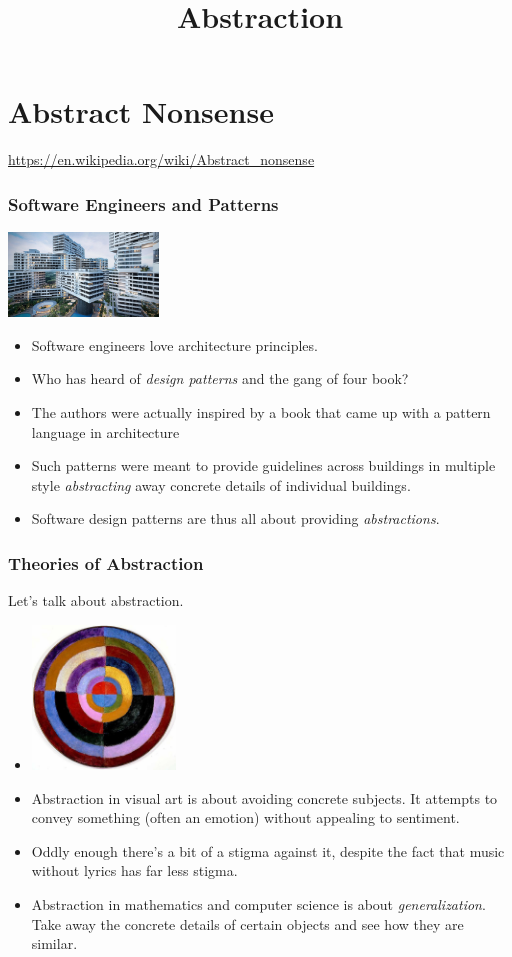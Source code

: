 \documentclass{beamer}
\title{Abstraction}
\begin{document}
\begin{frame}
\titlepage
\end{frame}
\section{Abstract Nonsense}

\begin{frame}
  \huge \centering \url{https://en.wikipedia.org/wiki/Abstract_nonsense}
\end{frame}

\begin{frame}
  \frametitle{Software Engineers and Patterns}
  \centering \includegraphics[width=0.3\textwidth]{images/architecture.jpg}
  \begin{itemize}
  \item<2-> Software engineers love architecture principles.
  \item<3-> Who has heard of \emph{design patterns} and the gang of four book?
  \item<4-> The authors were actually inspired by a book that came up with
    a pattern language in architecture
  \item<5-> Such patterns were meant to provide guidelines across buildings in multiple
    style \emph{abstracting} away concrete details of individual buildings.
  \item<6-> Software design patterns are thus all about providing \emph{abstractions}.
  \end{itemize}
\end{frame}

\begin{frame}
  \frametitle{Theories of Abstraction}
  Let's talk about abstraction.
  \begin{itemize}
  \item<2-> \includegraphics[width=0.3\textwidth]{images/abstract-art.jpg}
  \item<3-> Abstraction in visual
    art is about avoiding concrete subjects. It attempts
    to convey something (often an emotion) without appealing to sentiment.
  \item<4-> Oddly enough there's a bit of a stigma against it, despite the
    fact that music without lyrics has far less stigma.
  \item<5-> Abstraction in mathematics and computer science is about
    \emph{generalization}. Take away the concrete details of certain objects
    and see how they are similar.
  \end{itemize}
\end{frame}
\end{document}
